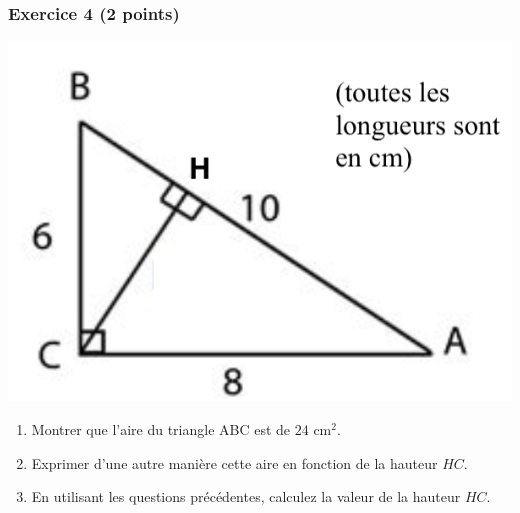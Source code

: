 \documentclass[14pt]{extreport}
\theoremstyle{plain}
\begin{document}
\subsubsection*{Exercice 4 (2 points)}
\includegraphics[scale=.45]{Exo4}\begin{enumerate}
\item Montrer que l'aire du triangle ABC est de $24$ cm${}^2$.
\item Exprimer d'une autre manière cette aire en fonction de la hauteur $HC$. 
\item En utilisant les questions précédentes, calculez la valeur de la hauteur $HC$. 
\end{enumerate}
\end{document}
